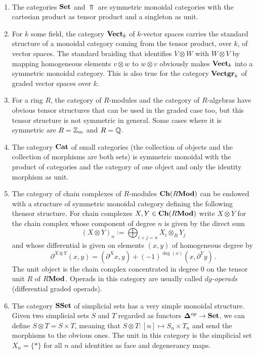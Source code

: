 \documentclass[TFM.tex]{subfiles}
\begin{document}
\begin{ex}\
\begin{enumerate}
\item The categories $\mathrm{\mathbf{Set}}$ and $\Top$ are symmetric monoidal categories with the cartesian product as tensor product and a singleton as unit. 
\item For $k$ some field, the category $\mathrm{\mathbf{Vect}}_k$ of $k$-vector spaces carries the standard structure of a monoidal category coming from the tensor product, over $k$, of vector spaces. The standard braiding that identifies $V\otimes W$ with $W\otimes V$ by mapping homogeneous elements $v\otimes w$ to $w\otimes v$ obviously makes $\mathrm{\mathbf{Vect}}_k$ into a symmetric monoidal category. This is also true for the category $\mathrm{\mathbf{Vectgr}}_k$ of graded vector spaces over $k$. 

\item For a ring $R$, the category of $R$-modules and the category of $R$-algebras have obvious tensor structures that can be used in the graded case too, but this tensor structure is not symmetric in general. Some cases where it is symmetric are $R=\mathbb{Z}_m$ and $R=\mathbb{Q}$. %

\item The category $\mathrm{\mathbf{Cat}}$ of small categories (the collection of objects and the collection of morphisms are both sets) is symmetric monoidal with the product of categories and the category of one object and only the identity morphism as unit.


\item The category of chain complexes of $R$-modules $\mathrm{\mathbf{Ch}}(R\mathrm{\mathbf{Mod}})$ can be endowed with a structure of symmetric monoidal category defining the following thensor structure. For chain complexes $X,Y\in\mathrm{\mathbf{Ch}}(R\mathrm{\mathbf{Mod}})$ write $X\otimes Y$ for the chain complex whose component of degree $n$ is given by the direct sum
\[
(X \otimes Y)_n := \bigoplus_{i + j = n} X_i \otimes_R Y_j
\]
and whose differential is given on elements $(x,y)$ of homogeneous degree by
\[
\partial^{X \otimes Y} (x, y) = (\partial^X x, y) + 
  (-1)^{\deg(x)} (x, \partial^Y y)
  \,.
\]
The unit object is the chain complex concentrated in degree 0 on the tensor unit $R$ of $R\mathrm{\mathbf{Mod}}$. Operads in this category are usually called \emph{$dg$-operads} (differential graded operads). 

\item The category $\mathrm{\mathbf{SSet}}$ of simplicial sets has a very simple monoidal structure. Given two simplicial sets $S$ and $T$ regarded as functors $\mathbf{\Delta}^{op}\to\mathrm{\mathbf{Set}}$, we can define $S\otimes T=S\times T$, meaning that $S\otimes T:[n]\mapsto S_n\times T_n$ and send the morphisms to the obvious ones. The unit in this category is the simplicial set $X_n=\{*\}$ for all $n$ and identities as face and degenerancy maps. 
\end{enumerate}



\end{ex}
\end{document}
